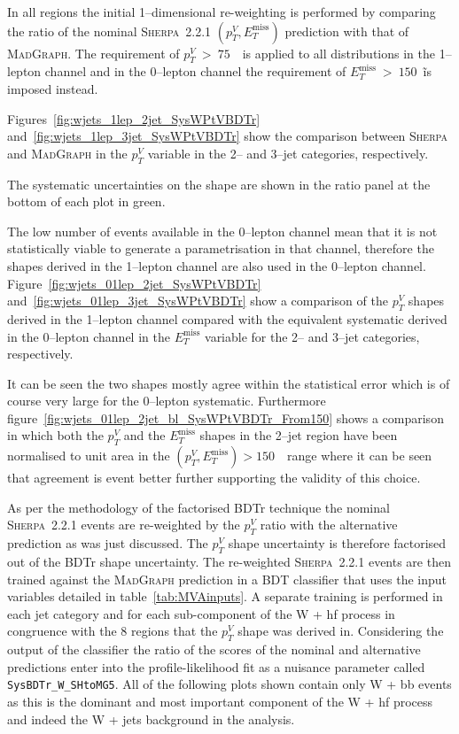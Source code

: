 In all regions the initial 1--dimensional re-weighting is performed by comparing
the ratio of the nominal \textsc{Sherpa}~2.2.1 $(p_T^V, E_T^{\text{miss}})$
prediction with that of \textsc{MadGraph}. The requirement of $p_T^V~>~75$~\GeV\
is applied to all distributions in the 1--lepton channel and in the 0--lepton
channel the requirement of $E_T^{\text{miss}}~>~150$~\GeV\~is imposed instead.

Figures~\ref{fig:wjets_1lep_2jet_SysWPtVBDTr}
and~\ref{fig:wjets_1lep_3jet_SysWPtVBDTr} show the comparison between
\textsc{Sherpa} and \textsc{MadGraph} in the  $p_T^V$ variable in the 2-- and
3--jet categories, respectively. 

The systematic uncertainties on the shape are shown in the ratio panel at the
bottom of each plot in green.

The low number of events available in the 0--lepton channel mean that it is not
statistically viable to generate a parametrisation in that channel, therefore
the shapes derived in the 1--lepton channel are also used in the 0--lepton
channel. Figure~\ref{fig:wjets_01lep_2jet_SysWPtVBDTr}
and~\ref{fig:wjets_01lep_3jet_SysWPtVBDTr} show a comparison of the $p_T^V$
shapes derived in the 1--lepton channel compared with the equivalent systematic
derived in the 0--lepton channel in the $E_T^{\text{miss}}$ variable for the 2--
and 3--jet categories, respectively.

It can be seen the two shapes mostly agree within the statistical error which is
of course very large for the 0--lepton systematic. Furthermore
figure~\ref{fig:wjets_01lep_2jet_bl_SysWPtVBDTr_From150} shows  a comparison in
which both the $p_T^V$ and the $E_T^{\text{miss}}$ shapes in the 2--jet region
have been normalised to unit area in the $(p_T^V, E_T^{\text{miss}}) > 150$~\GeV\
range where it can be seen that agreement is event better further supporting the
validity of this choice.


As per the methodology of the factorised BDTr technique the nominal
\textsc{Sherpa}~2.2.1 events are re-weighted by the $p_T^V$ ratio with the
alternative prediction as was just discussed. The $p_T^V$ shape uncertainty is
therefore factorised out of the BDTr shape uncertainty. The re-weighted
\textsc{Sherpa}~2.2.1 events are then trained against the \textsc{MadGraph}
prediction in a BDT classifier that uses the input variables detailed in
table~\ref{tab:MVAinputs}. A separate training is performed in each jet category
and for each sub-component of the W + hf process in congruence with the 8
regions that the $p_T^V$ shape was derived in. Considering the output of the
classifier the ratio of the scores of the nominal and alternative predictions
enter into the profile-likelihood fit as a nuisance parameter called
\texttt{SysBDTr\_W\_SHtoMG5}. All of the following plots shown contain only W +
bb events as this is the dominant and most important component of the W + hf
process and indeed the W + jets background in the analysis.

